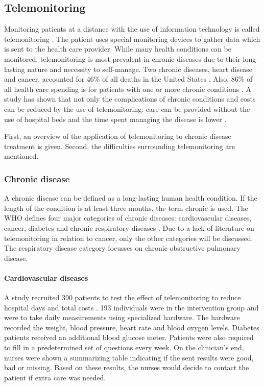     \subsection{Telemonitoring} \label{2_telemonitoring}
    Monitoring patients at a distance with the use of information technology is called telemonitoring \cite{systematic_review}. The patient uses special monitoring devices to gather data which is sent to the health care provider. While many health conditions can be monitored, telemonitoring is most prevalent in chronic diseases due to their long-lasting nature and necessity to self-manage. Two chronic diseases, heart disease and cancer, accounted for 46\% of all deaths in the United States \cite{national2016health}. Also, 86\% of all health care spending is for patients with one or more chronic conditions \cite{gerteis2014multiple}. A study has shown that not only the complications of chronic conditions and costs can be reduced by the use of telemonitoring: care can be provided without the use of hospital beds and the time spent managing the disease is lower \cite{telemonitoring_current_state}.

    First, an overview of the application of telemonitoring to chronic disease treatment is given. Second, the difficulties surrounding telemonitoring are mentioned.

        \subsubsection{Chronic disease}

        A chronic disease can be defined as a long-lasting human health condition. If the length of the condition is at least three months, the term chronic is used. The WHO defines four major categories of chronic diseases: cardiovascular diseases, cancer, diabetes and chronic respiratory diseases \cite{world2017noncommunicable}. Due to a lack of literature on telemonitoring in relation to cancer, only the other categories will be discussed. The respiratory disease category focusses on chronic obstructive pulmonary disease.

        \paragraph{Cardiovascular diseases} A study recruited 390 patients to test the effect of telemonitoring to reduce hospital days and total costs \cite{tompkins2010randomized}. 193 individuals were in the intervention group and were to take daily measurements using specialized hardware. The hardware recorded the weight, blood pressure, heart rate and blood oxygen levels. Diabetes patients received an additional blood glucose meter. Patients were also required to fill in a predetermined set of questions every week. On the clinician's end, nurses were shown a summarizing table indicating if the sent results were good, bad or missing. Based on these results, the nurses would decide to contact the patient if extra care was needed.

